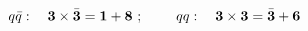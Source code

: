 \begin{equation}
q\bar{q}:~~~ \mbox{\boldmath$3$} \times \bar{\mbox{\boldmath$3$}}=\mbox{\boldmath$1$}+\mbox{\boldmath$8$}~;~~~~~~~qq:~~~
\mbox{\boldmath$3$} \times \mbox{\boldmath$3$} =\bar{\mbox{\boldmath$3$}} +\mbox{\boldmath$6$}   \label{eq:one}  
\end{equation}


